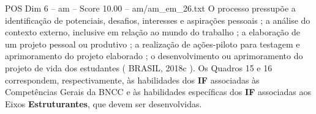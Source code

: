 \begin{textsample}{POS Dim 6 – am – Score 10.00 – am/am\_em\_26.txt}
O processo pressupõe a identificação de potenciais, desafios, interesses e aspirações pessoais ; a análise do contexto externo, inclusive em relação ao mundo do trabalho ; a elaboração de um projeto pessoal ou produtivo ; a realização de ações-piloto para testagem e aprimoramento do projeto elaborado ; o desenvolvimento ou aprimoramento do projeto de vida dos estudantes ( BRASIL, 2018c ).
Os Quadros 15 e 16 correspondem, respectivamente, às habilidades dos \textbf{IF} associadas às Competências Gerais da BNCC e às habilidades específicas dos \textbf{IF} associadas aos Eixos \textbf{Estruturantes}, que devem ser desenvolvidas.

\end{textsample}
